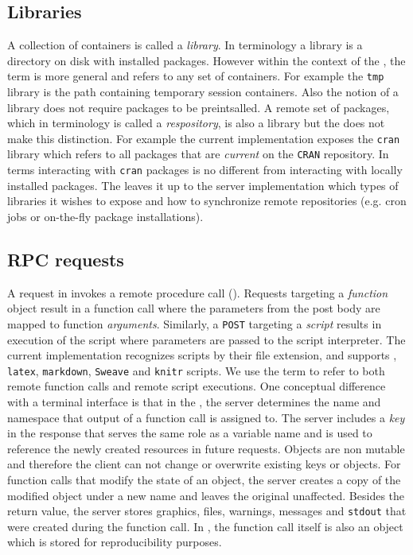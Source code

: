 \subsection{Libraries}

A collection of containers is called a \emph{library}. In \R terminology a library is a directory on disk with installed packages. However within the context of the \API, the term is more general and refers to any set of containers. For example the \texttt{tmp} library is the \API path containing temporary session containers. Also the \API notion of a library does not require packages to be preintsalled. A remote set of packages, which in \R terminology is called a \emph{respository}, is also a library but the \API does not make this distinction. For example the current implementation exposes the \texttt{cran} library which refers to all packages that are \emph{current} on the \texttt{CRAN} repository. In \API terms interacting with \texttt{cran} packages is no different from interacting with locally installed packages. The \API leaves it up to the server implementation which types of libraries it wishes to expose and how to synchronize remote repositories (e.g. cron jobs or on-the-fly package installations).

\subsection{RPC requests}

A \POST request in \OpenCPU invokes a remote procedure call (\RPC). Requests targeting a \emph{function} object result in a function call where the \HTTP parameters from the post body are mapped to function \emph{arguments}. Similarly, a \texttt{POST} targeting a \emph{script} results in execution of the script where \HTTP parameters are passed to the script interpreter. The current \OpenCPU implementation recognizes scripts by their file extension, and supports \R, \texttt{latex}, \texttt{markdown}, \texttt{Sweave} and \texttt{knitr} scripts. We use the term \RPC to refer to both remote function calls and remote script executions. One conceptual difference with a terminal interface is that in the \OpenCPU \API, the server determines the name and namespace that output of a function call is assigned to. The server includes a \emph{key} in the \RPC response that serves the same role as a variable name and is used to reference the newly created resources in future requests. Objects are non mutable and therefore the client can not change or overwrite existing keys or objects. For function calls that modify the state of an object, the server creates a copy of the modified object under a new name and leaves the original unaffected. Besides the return value, the server stores graphics, files, warnings, messages and \texttt{stdout} that were created during the function call. In \R, the function call itself is also an object which is stored for reproducibility purposes.

